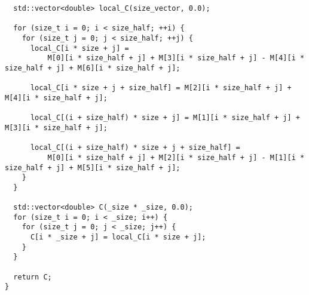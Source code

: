 \documentclass[a4paper, 14pt]{extarticle}
\begin{document}
\begin{lstlisting}
  std::vector<double> local_C(size_vector, 0.0);

  for (size_t i = 0; i < size_half; ++i) {
    for (size_t j = 0; j < size_half; ++j) {
      local_C[i * size + j] =
          M[0][i * size_half + j] + M[3][i * size_half + j] - M[4][i * size_half + j] + M[6][i * size_half + j];

      local_C[i * size + j + size_half] = M[2][i * size_half + j] + M[4][i * size_half + j];

      local_C[(i + size_half) * size + j] = M[1][i * size_half + j] + M[3][i * size_half + j];

      local_C[(i + size_half) * size + j + size_half] =
          M[0][i * size_half + j] + M[2][i * size_half + j] - M[1][i * size_half + j] + M[5][i * size_half + j];
    }
  }

  std::vector<double> C(_size * _size, 0.0);
  for (size_t i = 0; i < _size; i++) {
    for (size_t j = 0; j < _size; j++) {
      C[i * _size + j] = local_C[i * size + j];
    }
  }

  return C;
}
\end{lstlisting}


\newpage
\end{document}
